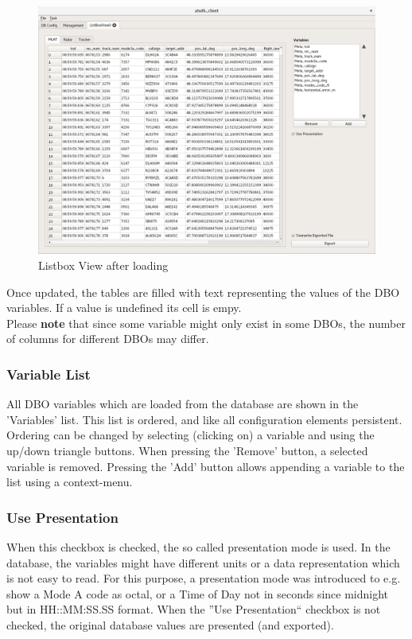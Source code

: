 \documentclass[10pt,letterpaper,extrafontsizes]{memoir}
\begin{document}
\begin{figure}[H]
    \hspace*{-2cm}
    \includegraphics[width=18cm]{../screenshots/listbox_loaded.png}
  \caption{Listbox View after loading}
  \label{fig:listbox_load}
\end{figure}

Once updated, the tables are filled with text representing the values of the DBO variables.  If a value is undefined its cell is empy. \\

Please \textbf{note} that since some variable might only exist in some DBOs, the number of columns for different DBOs may differ.

\subsubsection{Variable List}
All DBO variables which are loaded from the database are shown in the 'Variables' list. This list is ordered,
and like all configuration elements persistent. Ordering can be changed by selecting (clicking on) a variable
and using the up/down triangle buttons.
When pressing the 'Remove' button, a selected variable is removed.  Pressing the 'Add' button allows
appending a variable to the list using a context-menu.

\subsubsection{Use Presentation}
When this checkbox is checked, the so called presentation mode is used. In the database, the variables might have different units or a data representation which is not easy to read. For this purpose, a presentation mode was introduced to e.g. show a Mode A code as octal, or a Time of Day not in seconds since midnight but in HH::MM:SS.SS format. When the ''Use Presentation`` checkbox is not checked, the original database values are presented (and exported).
\end{document}
